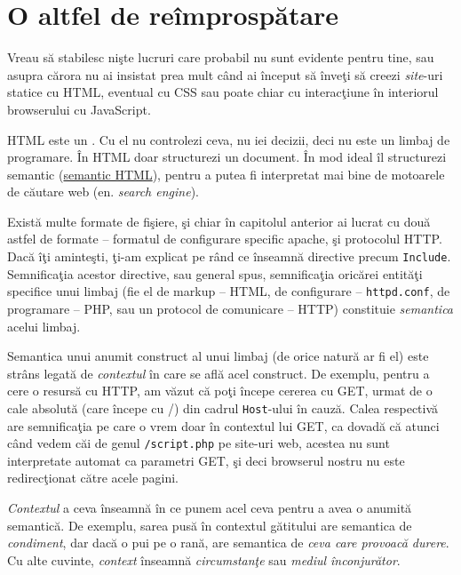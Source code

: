 \section{O altfel de reîmprospătare}

Vreau să stabilesc nişte lucruri care probabil nu sunt evidente
pentru tine, sau asupra cărora nu ai insistat prea mult
când ai început să înveţi să creezi \textit{site}-uri statice
cu HTML, eventual cu CSS sau poate chiar cu interacţiune
în interiorul browserului cu JavaScript.

HTML este un .
Cu el nu controlezi ceva, nu iei decizii, deci nu este
un limbaj de programare. În HTML doar
structurezi un document. În mod ideal îl structurezi
semantic (\href{http://en.wikipedia.org/wiki/Semantic_HTML}{semantic HTML}),
pentru a putea fi interpretat mai bine de motoarele de căutare web
(en. \textsl{search engine}).

Există multe formate de fişiere, şi chiar în capitolul anterior ai
lucrat cu două astfel de formate -- formatul de configurare specific apache, şi protocolul
HTTP. Dacă îţi aminteşti,
ţi-am explicat pe rând ce înseamnă directive precum \texttt{Include}.
Semnificaţia acestor directive, sau general spus, semnificaţia oricărei
entităţi specifice unui limbaj (fie el de markup -- HTML, de configurare
-- \texttt{httpd.conf}, de programare -- PHP, sau un protocol de
comunicare -- HTTP) constituie \textsl{semantica}
acelui limbaj.

Semantica unui anumit construct al unui limbaj (de orice natură
ar fi el) este strâns legată de \textit{contextul} în care se află acel
construct.
De exemplu, pentru a cere o resursă cu HTTP, am văzut că
poţi începe cererea cu GET, urmat
de o cale absolută (care începe cu {\glqq}/{\grqq}) din cadrul \texttt{Host}-ului
în cauză. Calea respectivă are semnificaţia pe care o vrem
doar în contextul lui {\glqq}GET{\grqq}, ca dovadă că atunci când vedem
căi de genul \texttt{/script.php} pe site-uri web,
acestea nu sunt interpretate automat ca parametri GET, şi
deci browserul nostru nu este redirecţionat către acele pagini.

\textsl{Contextul} a ceva înseamnă în ce punem acel ceva pentru a
avea o anumită semantică. De exemplu, sarea pusă în contextul
gătitului are semantica de \textit{condiment}, dar dacă
o pui pe o rană, are semantica de \textit{ceva care provoacă durere}.
Cu alte cuvinte, \textsl{context} înseamnă
\textsl{circumstanţe} sau \textsl{mediul înconjurător}. 

